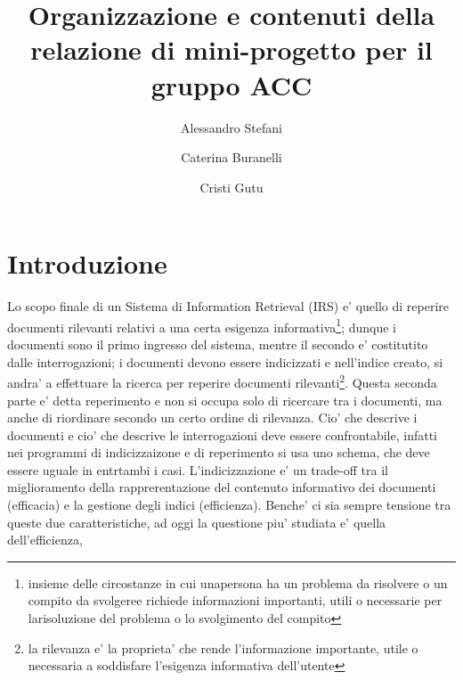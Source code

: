 \documentclass[runningheads]{llncs}
\begin{document}
%
\title{Organizzazione e contenuti della relazione di mini-progetto per il gruppo ACC}
%
%
\author{%
  Alessandro Stefani \and
  Caterina Buranelli \and
  Cristi Gutu}
%
%
%
\maketitle
%
\begin{abstract}
\end{abstract}

\section{Introduzione}
\label{sec:introduzione}
Lo scopo finale di un Sistema di Information Retrieval (IRS) e' quello di reperire documenti rilevanti relativi a una certa esigenza informativa\footnote{insieme delle circostanze in cui unapersona ha un problema da risolvere o un compito da svolgeree richiede informazioni importanti, utili o necessarie per larisoluzione del problema o lo svolgimento del compito}; dunque i documenti sono il primo ingresso del sistema, mentre il secondo e' costitutito dalle interrogazioni; i documenti devono essere indicizzati e nell'indice creato, si andra' a effettuare la ricerca per reperire documenti rilevanti\footnote{la rilevanza e' la proprieta' che rende l'informazione importante, utile o necessaria a soddisfare l'esigenza informativa dell'utente}. Questa seconda parte e' detta reperimento e non si occupa solo di ricercare tra i documenti, ma anche di riordinare secondo un certo ordine di rilevanza. Cio' che descrive i documenti e cio' che descrive le interrogazioni deve essere confrontabile, infatti nei programmi di indicizzaizone e di reperimento si usa uno schema, che deve essere uguale in entrtambi i casi.
L'indicizzazione e' un trade-off tra il  miglioramento della rapprerentazione del contenuto informativo dei documenti (efficacia) e la gestione degli indici (efficienza). Benche' ci sia sempre tensione tra queste due caratteristiche, ad oggi la questione piu' studiata e' quella dell'efficienza,
\end{document}
